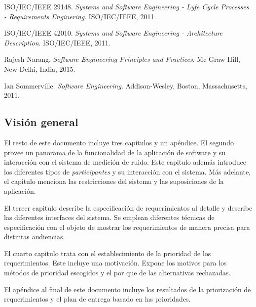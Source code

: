 \documentclass[paper=a4,oneside,fontsize=12pt]{article}
\newcommand{\smr}{sistema de medición de ruido}
\begin{document}
	\begingroup
		\renewcommand{\section}[2]{}
		\begin{thebibliography}{9}
			ISO/IEC/IEEE 29148. 
			\textit{Systems and Software Engineering - Lyfe Cycle Processes - Requirements Enginering}. 
			ISO/IEC/IEEE, 2011.
			
			ISO/IEC/IEEE 42010. 
			\textit{Systems and Software Engineering - Architecture Description}. 
			ISO/IEC/IEEE, 2011.		
			
			Rajesh Narang. 
			\textit{Software Engineering Principles and Practices}. 
			Mc Graw Hill, New Delhi, India, 2015.			
			
			Ian Sommerville. 
			\textit{Software Engineering}. 
			Addison-Wesley, Boston, Massachusetts, 2011.				

		\end{thebibliography}
	\endgroup
	
	\subsection{Visión general}
	
	El resto de este documento incluye tres capítulos y un apéndice. El segundo provee un panorama de la funcionalidad de la aplicación de software y su interacción con el \smr. Este capitulo además introduce los diferentes tipos de \emph{participantes} y su interacción con el sistema. Más adelante, el capitulo menciona las restricciones del sistema y las suposiciones de la aplicación.
	
	El tercer capitulo describe la especificación de requerimientos al detalle y describe las diferentes interfaces del sistema. Se emplean diferentes técnicas de especificación con el objeto de mostrar los requerimientos de manera precisa para distintas audiencias.
	
	El cuarto capitulo trata con el establecimiento de la prioridad de los requerimientos. Este incluye una motivación. Expone los motivos para los métodos de prioridad escogidos y el por que de las alternativas rechazadas.  
	
	El apéndice al final de este documento incluye los resultados de la priorización de requerimientos y el plan de entrega basado en las prioridades.
	
\end{document}
